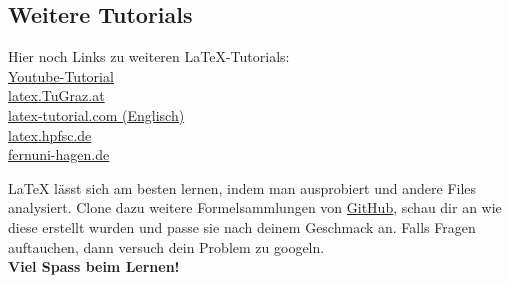\subsection{Weitere Tutorials}
Hier noch Links zu weiteren \LaTeX -Tutorials: \\
{\color{blue}
\href{https://www.youtube.com/watch?v=hRwUjJYeHjw}{Youtube-Tutorial} \\
\href{https://latex.tugraz.at/latex/tutorial}{latex.TuGraz.at}\\
\href{https://www.latex-tutorial.com/tutorials/}{latex-tutorial.com {\color{black}(Englisch)}}\\
\href{http://latex.hpfsc.de/content/latex_tutorial/}{latex.hpfsc.de}\\
\href{https://www.fernuni-hagen.de/imperia/md/content/zmi_2010/a026_latex_einf.pdf}{fernuni-hagen.de}}\\

\begin{aufgabe}[Ausprobieren!]
  \LaTeX{} lässt sich am besten lernen, indem man ausprobiert und andere Files analysiert. Clone dazu weitere Formelsammlungen von {\color{blue}\href{https://github.com/HSR-Stud/VorlageZFLaTex}{GitHub}}, schau dir an wie diese erstellt wurden und passe sie nach deinem Geschmack an. Falls Fragen auftauchen, dann versuch dein Problem zu googeln.\vspace{6pt}\\
  \textbf{\large Viel Spass beim Lernen! %
}
\end{aufgabe}
	


